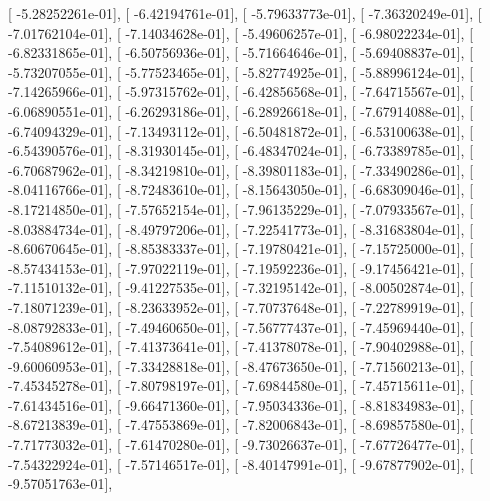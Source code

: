 \documentclass{article}
\begin{document}
       [ -5.28252261e-01],
       [ -6.42194761e-01],
       [ -5.79633773e-01],
       [ -7.36320249e-01],
       [ -7.01762104e-01],
       [ -7.14034628e-01],
       [ -5.49606257e-01],
       [ -6.98022234e-01],
       [ -6.82331865e-01],
       [ -6.50756936e-01],
       [ -5.71664646e-01],
       [ -5.69408837e-01],
       [ -5.73207055e-01],
       [ -5.77523465e-01],
       [ -5.82774925e-01],
       [ -5.88996124e-01],
       [ -7.14265966e-01],
       [ -5.97315762e-01],
       [ -6.42856568e-01],
       [ -7.64715567e-01],
       [ -6.06890551e-01],
       [ -6.26293186e-01],
       [ -6.28926618e-01],
       [ -7.67914088e-01],
       [ -6.74094329e-01],
       [ -7.13493112e-01],
       [ -6.50481872e-01],
       [ -6.53100638e-01],
       [ -6.54390576e-01],
       [ -8.31930145e-01],
       [ -6.48347024e-01],
       [ -6.73389785e-01],
       [ -6.70687962e-01],
       [ -8.34219810e-01],
       [ -8.39801183e-01],
       [ -7.33490286e-01],
       [ -8.04116766e-01],
       [ -8.72483610e-01],
       [ -8.15643050e-01],
       [ -6.68309046e-01],
       [ -8.17214850e-01],
       [ -7.57652154e-01],
       [ -7.96135229e-01],
       [ -7.07933567e-01],
       [ -8.03884734e-01],
       [ -8.49797206e-01],
       [ -7.22541773e-01],
       [ -8.31683804e-01],
       [ -8.60670645e-01],
       [ -8.85383337e-01],
       [ -7.19780421e-01],
       [ -7.15725000e-01],
       [ -8.57434153e-01],
       [ -7.97022119e-01],
       [ -7.19592236e-01],
       [ -9.17456421e-01],
       [ -7.11510132e-01],
       [ -9.41227535e-01],
       [ -7.32195142e-01],
       [ -8.00502874e-01],
       [ -7.18071239e-01],
       [ -8.23633952e-01],
       [ -7.70737648e-01],
       [ -7.22789919e-01],
       [ -8.08792833e-01],
       [ -7.49460650e-01],
       [ -7.56777437e-01],
       [ -7.45969440e-01],
       [ -7.54089612e-01],
       [ -7.41373641e-01],
       [ -7.41378078e-01],
       [ -7.90402988e-01],
       [ -9.60060953e-01],
       [ -7.33428818e-01],
       [ -8.47673650e-01],
       [ -7.71560213e-01],
       [ -7.45345278e-01],
       [ -7.80798197e-01],
       [ -7.69844580e-01],
       [ -7.45715611e-01],
       [ -7.61434516e-01],
       [ -9.66471360e-01],
       [ -7.95034336e-01],
       [ -8.81834983e-01],
       [ -8.67213839e-01],
       [ -7.47553869e-01],
       [ -7.82006843e-01],
       [ -8.69857580e-01],
       [ -7.71773032e-01],
       [ -7.61470280e-01],
       [ -9.73026637e-01],
       [ -7.67726477e-01],
       [ -7.54322924e-01],
       [ -7.57146517e-01],
       [ -8.40147991e-01],
       [ -9.67877902e-01],
       [ -9.57051763e-01],
\end{document}
